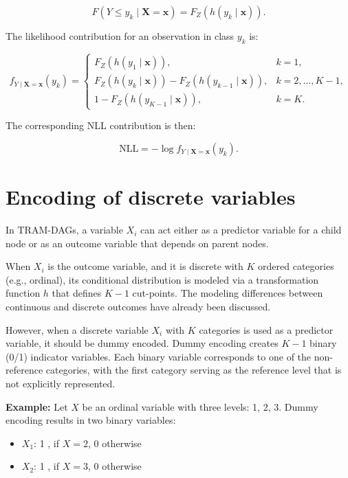 \begin{equation}
F(Y \leq y_k \mid \mathbf{X} = \mathbf{x}) = F_Z(h(y_k \mid \mathbf{x})).
\end{equation}

The likelihood contribution for an observation in class $y_k$ is:

\begin{equation}
f_{Y \mid \mathbf{X} = \mathbf{x}}(y_k) =
\begin{cases}
F_Z(h(y_1 \mid \mathbf{x})), & k = 1, \\
F_Z(h(y_k \mid \mathbf{x})) - F_Z(h(y_{k-1} \mid \mathbf{x})), & k = 2, \ldots, K - 1, \\
1 - F_Z(h(y_{K-1} \mid \mathbf{x})), & k = K.
\end{cases}
\end{equation}

The corresponding NLL contribution is then:

\begin{equation}
\text{NLL} = - \log f_{Y \mid \mathbf{X} = \mathbf{x}}(y_k).
\end{equation}






\section{Encoding of discrete variables} \label{sec:encoding_discrete_variables}

In TRAM-DAGs, a variable $X_i$ can act either as a predictor variable for a child node or as an outcome variable that depends on parent nodes.

When $X_i$ is the outcome variable, and it is discrete with $K$ ordered categories (e.g., ordinal), its conditional distribution is modeled via a transformation function $h$ that defines $K-1$ cut-points. The modeling differences between continuous and discrete outcomes have already been discussed.

However, when a discrete variable $X_i$ with $K$ categories is used as a predictor variable, it should be dummy encoded. Dummy encoding creates $K - 1$ binary (0/1) indicator variables. Each binary variable corresponds to one of the non-reference categories, with the first category serving as the reference level that is not explicitly represented.

\vspace{1em}
\noindent
\textbf{Example:} Let $X$ be an ordinal variable with three levels: 1, 2, 3. Dummy encoding results in two binary variables:
\begin{itemize}
  \item $X_1$: 1 , if $X = 2$, 0 otherwise
  \item $X_2$: 1 , if $X = 3$, 0 otherwise
\end{itemize}

